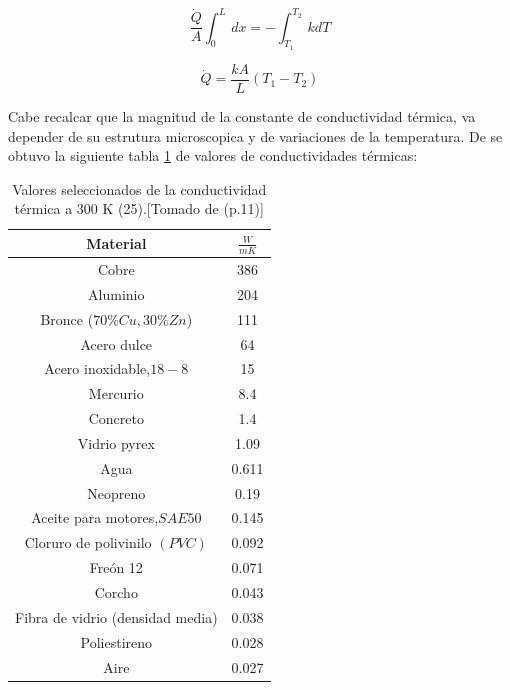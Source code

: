 \documentclass[12pt,letterpaper]{article}     %
\begin{document}
\begin{equation}
    \frac{\dot{Q}}{A}\displaystyle\int_{0}^{L}\, dx = -\displaystyle\int_{T_{1}}^{T_{2}}\,k dT
    \label{eq:intleyFourier1}
\end{equation}

\begin{equation}
    \dot{Q} = \frac{k A}{L} (T_{1}-T_{2})
    \label{eq:intleyFourier2}
\end{equation}




Cabe recalcar que la magnitud de la constante de conductividad térmica, va depender de su estrutura microscopica y de variaciones de la temperatura. De \cite{Warren} se obtuvo la siguiente tabla \ref{Tab:valoresdeconductividad(25C)}  de valores de conductividades térmicas:

\begin{table} [!ht]
\caption{Valores seleccionados de la conductividad térmica a 300 K (25\textcelsius).[Tomado de \cite{Mills}(p.11)]}

\label{Tab:valoresdeconductividad(25C)}
\begin{center}
\begin{tabular}{| c | c | }
\hline

\cline{1-2}
\textbf{Material}& \textbf{$\frac{W}{mK}$} \\
\hline 

Cobre & 386  \\
\hline
Aluminio & 204   \\
\hline
Bronce ($70\% Cu, 30\% Zn $) & 111  \\
\hline
Acero dulce & 64  \\
\hline
Acero inoxidable,$18-8$ & 15  \\
\hline
Mercurio & 8.4  \\
\hline
Concreto & 1.4  \\
\hline
Vidrio pyrex & 1.09  \\
\hline
Agua & 0.611  \\
\hline
Neopreno & 0.19  \\
\hline
Aceite para motores,$SAE 50$ & 0.145  \\
\hline
Cloruro de polivinilo $(PVC)$ & 0.092  \\
\hline
Freón 12 & 0.071  \\
\hline
Corcho & 0.043  \\
\hline
Fibra de vidrio (densidad media) & 0.038  \\
\hline
Poliestireno & 0.028  \\
\hline
Aire & 0.027  \\
\hline

\end{tabular}
\end{center}
\end{table}
\end{document}
